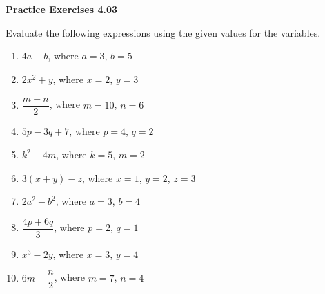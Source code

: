 \vspace{0.3ex}
\noindent\textbf{Practice Exercises 4.03}

\vspace{0.2ex}

Evaluate the following expressions using the given values for the variables.

\begin{enumerate}
    \item \(4a - b\), where \(a = 3\), \(b = 5\)  
    \item \(2x^2 + y\), where \(x = 2\), \(y = 3\)  
    \item \(\dfrac{m + n}{2}\), where \(m = 10\), \(n = 6\)  
    \item \(5p - 3q + 7\), where \(p = 4\), \(q = 2\)  
    \item \(k^2 - 4m\), where \(k = 5\), \(m = 2\)  
    \item \(3(x + y) - z\), where \(x = 1\), \(y = 2\), \(z = 3\)  
    \item \(2a^2 - b^2\), where \(a = 3\), \(b = 4\)  
    \item \(\dfrac{4p + 6q}{3}\), where \(p = 2\), \(q = 1\)  
    \item \(x^3 - 2y\), where \(x = 3\), \(y = 4\)  
    \item \(6m - \dfrac{n}{2}\), where \(m = 7\), \(n = 4\)  
\end{enumerate}
